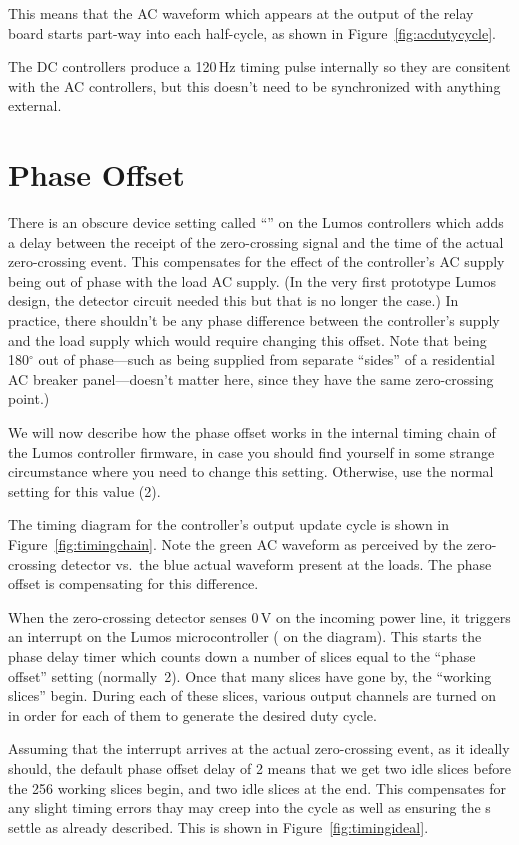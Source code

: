 \documentclass[letterpaper,twoside,onecolumn,openright,final]{memoir}
\begin{document}
This means that the AC waveform which appears at the output of the relay board starts part-way
into each half-cycle, as shown in Figure~\ref{fig:acdutycycle}.


The DC controllers produce a 120\,Hz timing pulse internally so they are consitent with the
AC controllers, but this doesn't need to be synchronized with anything external.

\section{Phase Offset}
There is an obscure device setting called ``'' on the Lumos controllers which adds a
delay between the receipt of the zero-crossing signal and the time of the actual zero-crossing
event.  This compensates for the effect of the controller's AC supply being out of phase with the
load AC supply.  (In the very first prototype Lumos design, the detector circuit needed this but
that is no longer the case.)  
In practice, there shouldn't be any phase difference between the controller's
supply and the load supply which would require changing this offset.  Note that being 180$^\circ$
out of phase---such as being supplied from separate ``sides'' of a residential AC breaker panel---doesn't 
matter here, since they have the same zero-crossing point.)

We will now describe how the phase offset works in the internal timing chain of the Lumos
controller firmware, in case you should find yourself in some strange circumstance where you need
to change this setting.  Otherwise, use the normal setting for this value (2).

The timing diagram for the controller's output update cycle is shown in Figure~\ref{fig:timingchain}.
Note the green AC waveform as perceived by the zero-crossing detector vs.\ the blue actual waveform
present at the loads.  The phase offset is compensating for this difference.


When the zero-crossing detector senses 0\,V on the incoming power line, it triggers an interrupt
on the Lumos microcontroller ( on the diagram).  This starts the phase delay timer which
counts down a number of slices equal to the ``phase offset'' setting (normally~2).  Once that many
slices have gone by, the ``working slices'' begin.  During each of these slices, various output
channels are turned on in order for each of them to generate the desired 
duty cycle.

Assuming that the interrupt arrives at the actual zero-crossing event, as it ideally should,
the default phase offset delay of 2 means that we get two
idle slices before the 256 working slices begin, and two idle slices at the end.  This compensates for
any slight timing errors thay may creep into the cycle as well as ensuring the s 
settle as already described.  This is shown in Figure~\ref{fig:timingideal}.

\end{document}

